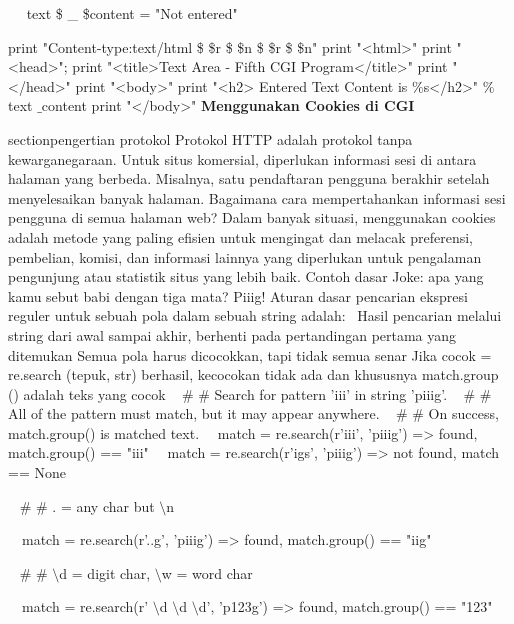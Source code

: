 \begin{12pt}
\begin{12pt}
~~ text \$  \_  \$content = "Not entered" 

print "Content-type:text/html \$  \setminus  \$r \$  \setminus  \$n \$  \setminus  \$r \$  \setminus  \$n" 
\noindent 
print "<html>" 
print "<head>"; 
print "<title>Text Area - Fifth CGI Program</title>" 
print "</head>" 
print "<body>" 
print "<h2> Entered Text Content is  $  \%  $s</h2>"  $  \%  $ text $  \_  $content 
print "</body>" 
{\fontsize{14pt}{14pt}\selectfont \textbf{Menggunakan Cookies di CGI} \\} 

section{pengertian protokol}
Protokol HTTP adalah protokol tanpa kewarganegaraan. Untuk situs komersial, diperlukan informasi sesi di antara halaman yang berbeda. Misalnya, satu pendaftaran pengguna berakhir setelah menyelesaikan banyak halaman. Bagaimana cara mempertahankan informasi sesi pengguna di semua halaman web? Dalam banyak situasi, menggunakan cookies adalah metode yang paling efisien untuk mengingat dan melacak preferensi, pembelian, komisi, dan informasi lainnya yang diperlukan untuk pengalaman pengunjung atau statistik situs yang lebih baik. 
Contoh dasar 
Joke: apa yang kamu sebut babi dengan tiga mata? Piiig! 
Aturan dasar pencarian ekspresi reguler untuk sebuah pola dalam sebuah string adalah: \
Hasil pencarian melalui string dari awal sampai akhir, berhenti pada pertandingan pertama yang ditemukan  Semua pola harus dicocokkan, tapi tidak semua senar Jika cocok = re.search (tepuk, str) berhasil, kecocokan tidak ada dan khususnya match.group () adalah teks yang cocok
~  $  \#  $ $  \#  $ Search for pattern 'iii' in string 'piiig'. 
~  $  \#  $ $  \#  $ All of the pattern must match, but it may appear anywhere. 
~  $  \#  $ $  \#  $ On success, match.group() is matched text. 
~~match = re.search(r'iii', 'piiig') =>  found, match.group() == "iii" 
\noindent 
~~match = re.search(r'igs', 'piiig') =>  not found, match == None \par
\vspace{12pt}
\noindent 
~  $  \#  $ $  \#  $ . = any char but  $  \setminus  $n \par
\noindent 
~~match = re.search(r'..g', 'piiig') =>  found, match.group() == "iig" \par
\vspace{12pt}
\noindent 
~  $  \#  $ $  \#  $  $  \setminus  $d = digit char,  $  \setminus  $w = word char \par
\noindent 
~~match = re.search(r' $  \setminus  $d $  \setminus  $d $  \setminus  $d', 'p123g') =>  found, match.group() == "123" \par

\end{12pt}
\end{12pt}

